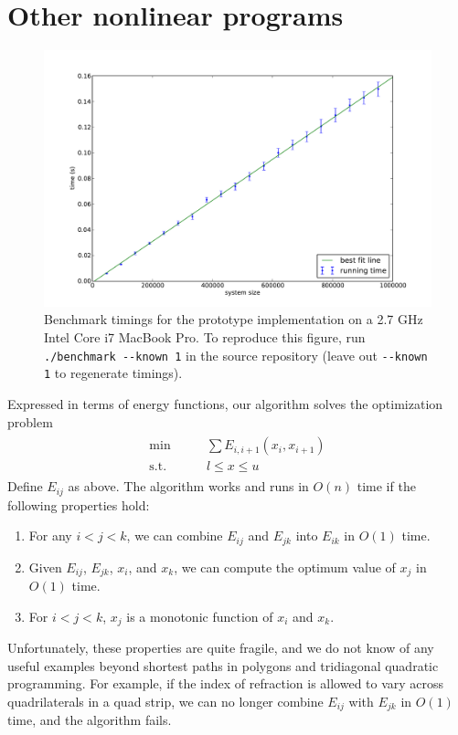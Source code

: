 \documentclass[11pt]{article}
\begin{document}
\section{Other nonlinear programs}

\begin{figure}[t]
\begin{center}
\includegraphics[width=.7\columnwidth]{benchmark.pdf}
\end{center}
\vspace{-.2in}
\cprotect\caption{Benchmark timings for the prototype implementation on a 2.7 GHz Intel Core i7 MacBook Pro.  To reproduce this figure, run \verb+./benchmark --known 1+ in the source repository
(leave out \verb+--known 1+ to regenerate timings).}
\label{benchmark}
\end{figure}

Expressed in terms of energy functions, our algorithm solves the optimization problem
\begin{align*}
\begin{array}{cc}
\min          \qquad& \sum E_{i,i+1}(x_i,x_{i+1}) \\
\textrm{s.t.} & l \le x \le u
\end{array}
\end{align*}
Define $E_{ij}$ as above.  The algorithm works and runs in $O(n)$ time if the following properties hold:
\begin{enumerate}
\item For any $i < j < k$, we can combine $E_{ij}$ and $E_{jk}$ into $E_{ik}$ in $O(1)$ time.
\item Given $E_{ij}$, $E_{jk}$, $x_i$, and $x_k$, we can compute the optimum value of $x_j$ in $O(1)$ time.
\item For $i < j < k$, $x_j$ is a monotonic function of $x_i$ and $x_k$.
\end{enumerate}
Unfortunately, these properties are quite fragile, and we do not know of any useful examples beyond shortest paths in polygons and tridiagonal quadratic programming.  For example, if the index of
refraction is allowed to vary across quadrilaterals in a quad strip, we can no longer combine $E_{ij}$ with $E_{jk}$ in $O(1)$ time, and the algorithm fails.
\end{document}
